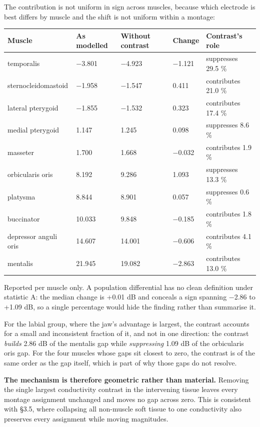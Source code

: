 \documentclass[
  11pt,
]{article}
\newcounter{none} %
\begin{document}
The contribution is not uniform in sign across muscles, because which electrode
is best differs by muscle and the shift is not uniform within a montage:

{\def\LTcaptype{none} %
\begin{longtable}[]{@{}lllll@{}}
\toprule\noalign{}
Muscle & As modelled & Without contrast & Change & Contrast's role \\
\midrule\noalign{}
\endhead
\bottomrule\noalign{}
\endlastfoot
temporalis & −3.801 & −4.923 & −1.121 & suppresses 29.5 \% \\
sternocleidomastoid & −1.958 & −1.547 & 0.411 & contributes 21.0 \% \\
lateral pterygoid & −1.855 & −1.532 & 0.323 & contributes 17.4 \% \\
medial pterygoid & 1.147 & 1.245 & 0.098 & suppresses 8.6 \% \\
masseter & 1.700 & 1.668 & −0.032 & contributes 1.9 \% \\
orbicularis oris & 8.192 & 9.286 & 1.093 & suppresses 13.3 \% \\
platysma & 8.844 & 8.901 & 0.057 & suppresses 0.6 \% \\
buccinator & 10.033 & 9.848 & −0.185 & contributes 1.8 \% \\
depressor anguli oris & 14.607 & 14.001 & −0.606 & contributes 4.1 \% \\
mentalis & 21.945 & 19.082 & −2.863 & contributes 13.0 \% \\
\end{longtable}
}

Reported per muscle only. A population differential has no clean definition
under statistic A: the median change is +0.01 dB and conceals a sign spanning
−2.86 to +1.09 dB, so a single percentage would hide the finding rather than
summarise it.

For the labial group, where the jaw's advantage is largest, the contrast
accounts for a small and inconsistent fraction of it, and not in one direction:
the contrast \emph{builds} 2.86 dB of the mentalis gap while \emph{suppressing} 1.09 dB of
the orbicularis oris gap. For the four muscles
whose gaps sit closest to zero, the contrast is of the same order as the gap
itself, which is part of why those gaps do not resolve.

\textbf{The mechanism is therefore geometric rather than material.} Removing the
single largest conductivity contrast in the intervening tissue leaves every
montage assignment unchanged and moves no gap across zero. This is consistent
with §3.5, where collapsing all non-muscle soft tissue to one conductivity also
preserves every assignment while moving magnitudes.
\end{document}
